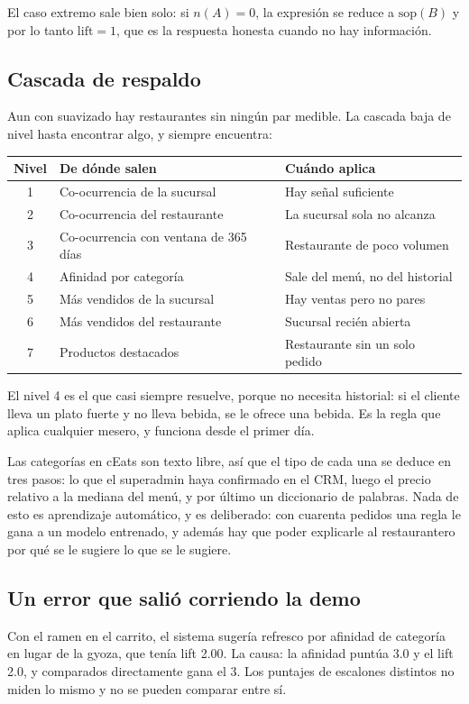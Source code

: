 \documentclass[11pt,letterpaper]{article}
\begin{document}
El caso extremo sale bien solo: si $n(A) = 0$, la expresión se reduce a
$\mathrm{sop}(B)$ y por lo tanto $\mathrm{lift} = 1$, que es la respuesta honesta
cuando no hay información.

\subsection{Cascada de respaldo}
Aun con suavizado hay restaurantes sin ningún par medible. La cascada baja de
nivel hasta encontrar algo, y siempre encuentra:

\begin{longtable}{@{}cp{6.0cm}p{6.0cm}@{}}
\toprule
\textbf{Nivel} & \textbf{De dónde salen} & \textbf{Cuándo aplica} \\
\midrule
\endhead
1 & Co-ocurrencia de la sucursal & Hay señal suficiente \\
2 & Co-ocurrencia del restaurante & La sucursal sola no alcanza \\
3 & Co-ocurrencia con ventana de 365 días & Restaurante de poco volumen \\
4 & Afinidad por categoría & Sale del menú, no del historial \\
5 & Más vendidos de la sucursal & Hay ventas pero no pares \\
6 & Más vendidos del restaurante & Sucursal recién abierta \\
7 & Productos destacados & Restaurante sin un solo pedido \\
\bottomrule
\end{longtable}

El nivel 4 es el que casi siempre resuelve, porque no necesita historial: si el
cliente lleva un plato fuerte y no lleva bebida, se le ofrece una bebida. Es la
regla que aplica cualquier mesero, y funciona desde el primer día.

Las categorías en cEats son texto libre, así que el tipo de cada una se deduce
en tres pasos: lo que el superadmin haya confirmado en el CRM, luego el precio
relativo a la mediana del menú, y por último un diccionario de palabras. Nada de
esto es aprendizaje automático, y es deliberado: con cuarenta pedidos una regla
le gana a un modelo entrenado, y además hay que poder explicarle al restaurantero
por qué se le sugiere lo que se le sugiere.

\subsection{Un error que salió corriendo la demo}
Con el ramen en el carrito, el sistema sugería refresco por afinidad de
categoría en lugar de la gyoza, que tenía lift 2.00. La causa: la afinidad
puntúa 3.0 y el lift 2.0, y comparados directamente gana el 3. Los puntajes de
escalones distintos no miden lo mismo y no se pueden comparar entre sí.
\end{document}

